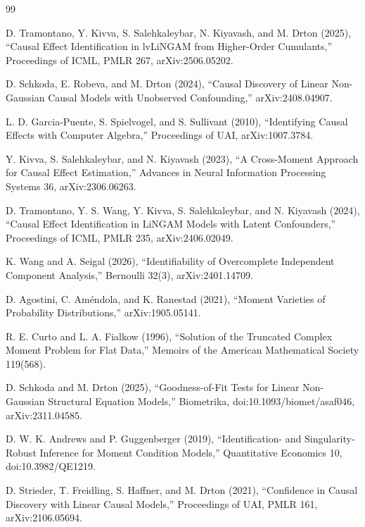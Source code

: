 \documentclass{article}
\begin{document}
\begin{thebibliography}{99}

   D. Tramontano, Y. Kivva, S. Salehkaleybar, N. Kiyavash, and M. Drton (2025), ``Causal Effect Identification in lvLiNGAM from Higher-Order Cumulants,'' Proceedings of ICML, PMLR 267, arXiv:2506.05202.

   D. Schkoda, E. Robeva, and M. Drton (2024), ``Causal Discovery of Linear Non-Gaussian Causal Models with Unobserved Confounding,'' arXiv:2408.04907.

   L. D. Garcia-Puente, S. Spielvogel, and S. Sullivant (2010), ``Identifying Causal Effects with Computer Algebra,'' Proceedings of UAI, arXiv:1007.3784.

   Y. Kivva, S. Salehkaleybar, and N. Kiyavash (2023), ``A Cross-Moment Approach for Causal Effect Estimation,'' Advances in Neural Information Processing Systems 36, arXiv:2306.06263.

   D. Tramontano, Y. S. Wang, Y. Kivva, S. Salehkaleybar, and N. Kiyavash (2024), ``Causal Effect Identification in LiNGAM Models with Latent Confounders,'' Proceedings of ICML, PMLR 235, arXiv:2406.02049.

   K. Wang and A. Seigal (2026), ``Identifiability of Overcomplete Independent Component Analysis,'' Bernoulli 32(3), arXiv:2401.14709.

   D. Agostini, C. Am\'{e}ndola, and K. Ranestad (2021), ``Moment Varieties of Probability Distributions,'' arXiv:1905.05141.

   R. E. Curto and L. A. Fialkow (1996), ``Solution of the Truncated Complex Moment Problem for Flat Data,'' Memoirs of the American Mathematical Society 119(568).

   D. Schkoda and M. Drton (2025), ``Goodness-of-Fit Tests for Linear Non-Gaussian Structural Equation Models,'' Biometrika, doi:10.1093/biomet/asaf046, arXiv:2311.04585.

   D. W. K. Andrews and P. Guggenberger (2019), ``Identification- and Singularity-Robust Inference for Moment Condition Models,'' Quantitative Economics 10, doi:10.3982/QE1219.

   D. Strieder, T. Freidling, S. Haffner, and M. Drton (2021), ``Confidence in Causal Discovery with Linear Causal Models,'' Proceedings of UAI, PMLR 161, arXiv:2106.05694.


\end{thebibliography}
\end{document}
